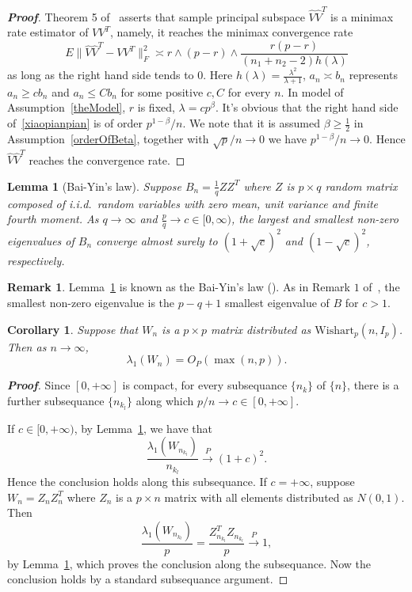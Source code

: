 \documentclass[review]{elsarticle}
\theoremstyle{plain}
\newtheorem{corollary}{\quad\quad Corollary}
\newtheorem{lemma}{\quad\quad Lemma}
\theoremstyle{definition}
\newtheorem{remark}{\quad\quad Remark}
\theoremstyle{remark}
\begin{document}
\begin{proof}[\textbf{Proof}]
    Theorem 5 of~\cite{Cai2012Sparse} asserts that sample principal subspace $\hat{V}\hat{V}^T$ is a minimax rate estimator of $VV^T$, namely, it reaches the minimax convergence rate
    \begin{equation}\label{xiaopianpian}
         E\|\hat{V}\hat{V}^T-VV^T\|^2_F\asymp r\wedge (p-r)\wedge \frac{r(p-r)}{(n_1+n_2-2)h(\lambda)}
    \end{equation}
    as long as the right hand side tends to $0$. Here $h(\lambda)=\frac{\lambda^2}{\lambda+1}$, $a_n\asymp b_n$ represents $a_n\geq cb_n$ and $a_n\leq Cb_n$ for some positive $c,C$ for every $n$. In model of Assumption~\ref{theModel},  $r$ is fixed, $\lambda=cp^\beta$.
    It's obvious that the right hand side of~\eqref{xiaopianpian} is of order ${p^{1-\beta}}/{n}$.
    We note that it is assumed $\beta\geq \frac{1}{2}$ in Assumption~\ref{orderOfBeta}, together with ${\sqrt{p}}/{n}\to 0$ we have
    ${p^{1-\beta}}/{n}\to 0$. Hence
    $\hat{V}\hat{V}^T$ reaches the convergence rate.

\end{proof}
\begin{lemma}[Bai-Yin's law]\label{baiyin}
    Suppose $B_n=\frac{1}{q} Z Z^T$ where $Z$ is $p\times q$ random matrix composed of i.i.d.\ random variables with zero mean, unit variance and finite fourth moment.
    As $q\to \infty$ and $\frac{p}{q}\to c\in [0,\infty)$, the largest and smallest non-zero eigenvalues of $B_n$ converge almost surely to ${(1+\sqrt{c})}^2$ and $(1-\sqrt{c})^2$, respectively.
\end{lemma}
\begin{remark}
    Lemma~\ref{baiyin} is known as the Bai-Yin's law (\cite{bai1993limit}). As in Remark $1$ of~\cite{bai1993limit}, the smallest non-zero eigenvalue is the $p-q+1$ smallest eigenvalue of $B$ for $c>1$.
\end{remark}
\begin{corollary}\label{maxEigen}
    Suppose that $W_n$ is a $p \times p$ matrix distributed as $\mathrm{Wishart}_p(n,I_{p})$. Then as $n\to \infty$,
    $$
        \lambda_1(W_n)=O_P(\max(n,p)).
    $$
\end{corollary}
\begin{proof}[\textbf{Proof}]
    Since $[0,+\infty]$ is compact, for every subsequance $\{n_{k}\}$ of $\{n\}$, there is a further subsequance $\{n_{k_l}\}$ along which $p/n\to c\in [0,+\infty]$.

    If $c\in [0,+\infty)$, by Lemma~\ref{baiyin}, we have that
    $$
    \frac{\lambda_1(W_{n_{k_l}})}{n_{k_l}}\xrightarrow{P}{(1+c)}^2.
    $$
    Hence the conclusion holds along this subsequance. If $c=+\infty$, suppose $W_n=Z_n Z_n^T$ where $Z_n$ is a $p\times n$ matrix with all elements distributed as $N(0,1)$. Then
    $$
    \frac{\lambda_1(W_{n_{k_l}})}{p}=\frac{Z_{n_{k_l}}^T Z_{n_{k_l}}}{p}\xrightarrow{P} 1,
    $$
    by Lemma~\ref{baiyin}, which proves the conclusion along the subsequance. Now the conclusion holds by a standard subsequance argument.
\end{proof}
\end{document}
